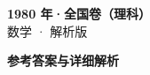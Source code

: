 \documentclass[zihao=-4, a4paper]{ctexart}
\begin{document}
\begin{center}
  {\Large\bfseries 1980 年·全国卷（理科）}\\[4pt]
  {\large 数学 · 解析版}
\end{center}
\medskip
{}

\clearpage
{}
\begin{center}{\Large\bfseries 参考答案与详细解析}\end{center}
\medskip

\end{document}
